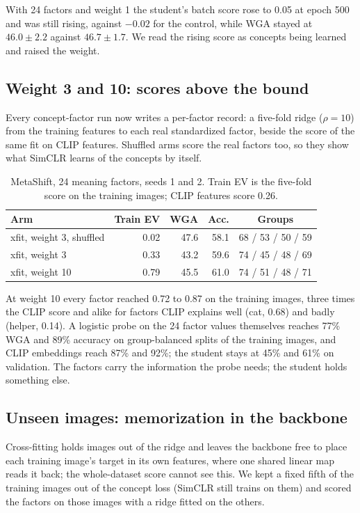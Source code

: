 \documentclass{article}
\begin{document}
With 24 factors and weight 1 the student's batch score rose to 0.05 at epoch 500 and was still rising,
against $-0.02$ for the control, while WGA stayed at $46.0\pm2.2$ against $46.7\pm1.7$. We read the
rising score as concepts being learned and raised the weight.

\subsection{Weight 3 and 10: scores above the bound}
Every concept-factor run now writes a per-factor record: a five-fold ridge ($\rho=10$) from the
training features to each real standardized factor, beside the score of the same fit on CLIP features.
Shuffled arms score the real factors too, so they show what SimCLR learns of the concepts by itself.

\begin{table}[h]
\centering
\caption{MetaShift, 24 meaning factors, seeds 1 and 2. Train EV is the five-fold score on the training
images; CLIP features score 0.26.}
\label{tab:weights}
\small
\begin{tabular}{l r r r c}
\toprule
Arm & Train EV & WGA & Acc. & Groups \\
\midrule
xfit, weight 3, shuffled & 0.02 & 47.6 & 58.1 & 68 / 53 / 50 / 59 \\
xfit, weight 3 & 0.33 & 43.2 & 59.6 & 74 / 45 / 48 / 69 \\
xfit, weight 10 & 0.79 & 45.5 & 61.0 & 74 / 51 / 48 / 71 \\
\bottomrule
\end{tabular}
\end{table}

At weight 10 every factor reached 0.72 to 0.87 on the training images, three times the CLIP score and
alike for factors CLIP explains well (cat, 0.68) and badly (helper, 0.14). A logistic probe on the 24
factor values themselves reaches 77\% WGA and 89\% accuracy on group-balanced splits of the training
images, and CLIP embeddings reach 87\% and 92\%; the student stays at 45\% and 61\% on validation. The
factors carry the information the probe needs; the student holds something else.

\subsection{Unseen images: memorization in the backbone}
Cross-fitting holds images out of the ridge and leaves the backbone free to place each training image's
target in its own features, where one shared linear map reads it back; the whole-dataset score cannot
see this. We kept a fixed fifth of the training images out of the concept loss (SimCLR still trains on
them) and scored the factors on those images with a ridge fitted on the others.
\end{document}
